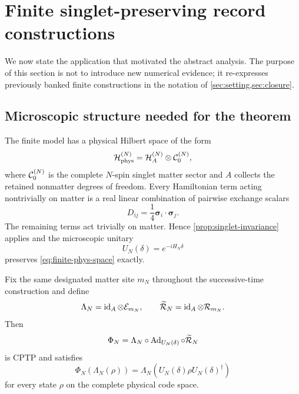 \section{Finite singlet-preserving record constructions}
\label{sec:finite}

We now state the application that motivated the abstract analysis.  The purpose of this section is not to introduce new numerical evidence; it re-expresses previously banked finite constructions in the notation of \cref{sec:setting,sec:closure}.

\subsection{Microscopic structure needed for the theorem}

The finite model has a physical Hilbert space of the form
\begin{equation}
  \mathcal H_{\mathrm{phys}}^{(N)}
  =\mathcal H_A^{(N)}\otimes\mathcal C_0^{(N)},
  \label{eq:finite-phys-space}
\end{equation}
where $\mathcal C_0^{(N)}$ is the complete $N$-spin singlet matter sector and $A$ collects the retained nonmatter degrees of freedom.  Every Hamiltonian term acting nontrivially on matter is a real linear combination of pairwise exchange scalars
\begin{equation}
  D_{ij}=\frac14\boldsymbol\sigma_i\cdot\boldsymbol\sigma_j.
\end{equation}
The remaining terms act trivially on matter.  Hence \cref{prop:singlet-invariance} applies and the microscopic unitary
\begin{equation}
  U_N(\delta)=e^{-iH_N\delta}
\end{equation}
preserves \cref{eq:finite-phys-space} exactly.

Fix the same designated matter site $m_N$ throughout the successive-time construction and define
\begin{equation}
  \Lambda_N
  =\operatorname{id}_A\otimes\mathcal E_{m_N},
  \qquad
  \widetilde{\mathcal R}_N
  =\operatorname{id}_A\otimes\mathcal R_{m_N}.
\end{equation}
Then
\begin{equation}
  \Phi_N
  =\Lambda_N\circ\operatorname{Ad}_{U_N(\delta)}\circ\widetilde{\mathcal R}_N
  \label{eq:finite-Phi}
\end{equation}
is CPTP and satisfies
\begin{equation}
  \Phi_N(\Lambda_N(\rho))
  =\Lambda_N(U_N(\delta)\rho U_N(\delta)^\dagger)
  \label{eq:finite-intertwine}
\end{equation}
for every state $\rho$ on the complete physical code space.

